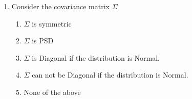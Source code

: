 \documentclass{article}
\begin{document}
\begin{enumerate}
\begin{enumerate}
     \end{enumerate}

     \item Consider the covariance matrix $\Sigma$

     \begin{enumerate}
         \item $\Sigma$ is symmetric
         \item $\Sigma$ is PSD
         \item $\Sigma$ is Diagonal if the distribution is Normal.
         \item $\Sigma$ can not be Diagonal if the distribution is Normal.
         \item None of the above
     \end{enumerate}


\end{enumerate}
\end{document}
